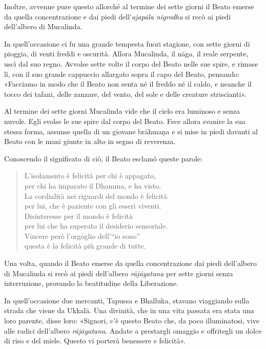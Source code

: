 Inoltre, avvenne pure questo allorché al termine dei sette giorni il Beato
emerse da quella concentrazione e dai piedi dell’\emph{ajapāla nigrodha} si recò
ai piedi dell’albero di Mucalinda.

In quell’occasione ci fu una grande tempesta fuori stagione, con sette giorni di
pioggia, di venti freddi e oscurità. Allora Mucalinda, il nāga, il reale
serpente, uscì dal suo regno. Avvolse sette volte il corpo del Beato nelle sue
spire, e rimase lì, con il suo grande cappuccio allargato sopra il capo del
Beato, pensando: «Facciamo in modo che il Beato non senta né il freddo né il
caldo, e neanche il tocco dei tafani, delle zanzare, del vento, del sole e delle
creature striscianti».

Al termine dei sette giorni Mucalinda vide che il cielo era luminoso e senza
nuvole. Egli svolse le sue spire dal corpo del Beato. Fece allora svanire la sua
stessa forma, assunse quella di un giovane brāhmaṇa e si mise in piedi davanti
al Beato con le mani giunte in alto in segno di reverenza.

Conoscendo il significato di ciò, il Beato esclamò queste parole:

\begin{quote}
L’isolamento è felicità per chi è appagato, \\
per chi ha imparato il Dhamma, e ha visto. \\
La cordialità nei riguardi del mondo è felicità \\
per lui, che è paziente con gli esseri viventi. \\
Disinteresse per il mondo è felicità \\
per lui che ha superato il desiderio sensoriale. \\
Vincere però l’orgoglio dell’“io sono” \\
questa è la felicità più grande di tutte.
\end{quote}


Una volta, quando il Beato emerse da quella concentrazione dai piedi dell’albero
di Mucalinda si recò ai piedi dell’albero \emph{rājāyatana} per sette giorni
senza interruzione, provando la beatitudine della Liberazione.

\label{pag41}%
In quell’occasione due mercanti, Tapussa e Bhalluka,
stavano viaggiando sulla
strada che viene da Ukkalā. Una divinità, che in una vita passata era stata una
loro parente, disse loro: «Signori, c’è questo Beato che, da poco illuminatosi,
vive alle radici dell’albero \emph{rājāyatana}. Andate a prestargli omaggio e
offritegli un dolce di riso e del miele. Questo vi porterà benessere e
felicità».

